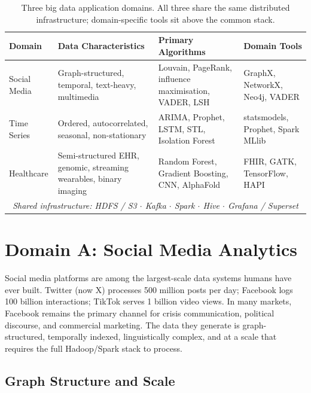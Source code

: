 \begin{table}[htbp]
\centering
\renewcommand{\arraystretch}{1.4}
\begin{tabular}{lp{3.0cm}p{3.0cm}p{3.2cm}}
  \toprule
  \textbf{Domain} & \textbf{Data Characteristics}
    & \textbf{Primary Algorithms} & \textbf{Domain Tools} \\
  \midrule
  Social Media
    & Graph-structured, temporal, text-heavy, multimedia
    & Louvain, PageRank, influence maximisation, VADER, LSH
    & GraphX, NetworkX, Neo4j, VADER \\
  Time Series
    & Ordered, autocorrelated, seasonal, non-stationary
    & ARIMA, Prophet, LSTM, STL, Isolation Forest
    & statsmodels, Prophet, Spark MLlib \\
  Healthcare
    & Semi-structured EHR, genomic, streaming wearables, binary imaging
    & Random Forest, Gradient Boosting, CNN, AlphaFold
    & FHIR, GATK, TensorFlow, HAPI \\
  \midrule
  \multicolumn{4}{c}{\textit{Shared infrastructure: HDFS / S3 $\cdot$
    Kafka $\cdot$ Spark $\cdot$ Hive $\cdot$ Grafana / Superset}} \\
  \bottomrule
\end{tabular}
\caption{Three big data application domains. All three share the same
         distributed infrastructure; domain-specific tools sit above
         the common stack.}
\label{tab:three-domains}
\end{table}

\section{Domain A: Social Media Analytics}
\label{sec:social-media}

Social media platforms are among the largest-scale data systems humans
have ever built. Twitter (now X) processes 500 million posts per day;
Facebook logs 100 billion interactions; TikTok serves 1 billion video
views. In many markets, Facebook remains the primary channel for crisis
communication, political discourse, and commercial marketing. The data they generate is
graph-structured, temporally indexed, linguistically complex, and at a
scale that requires the full Hadoop/Spark stack to process.

\subsection{Graph Structure and Scale}
\label{subsec:social-graph}

